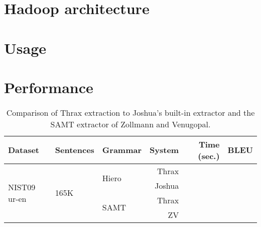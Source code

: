 \documentclass{pbml}
\begin{document}
\section{Hadoop architecture}
\label{sec:hadoop}

\section{Usage}
\label{sec:usage}

\section{Performance}
\label{sec:performance}

\begin{table}[t]
\caption{Comparison of Thrax extraction to Joshua's built-in extractor and the SAMT extractor of Zollmann and Venugopal.}
\begin{tabular}{l | l | l | r | r | r}
Dataset & Sentences & Grammar & System & Time (sec.) & BLEU \\ \hline
\multirow{4}{*}{NIST09 ur-en} & \multirow{4}{*}{165K} & \multirow{2}{*}{Hiero} & Thrax & & \\
& & & Joshua & & \\
& & \multirow{2}{*}{SAMT} & Thrax & & \\
& & & ZV & & \\

\end{tabular}
\end{table}


\end{document}
